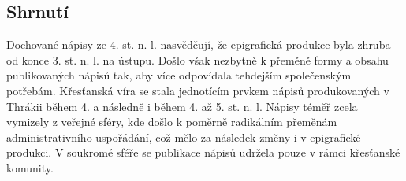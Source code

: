 
\subsection[shrnutí-21]{Shrnutí}

Dochované nápisy ze 4. st. n. l. nasvědčují, že epigrafická produkce byla zhruba od konce 3. st. n. l. na ústupu. Došlo však nezbytně k přeměně formy a obsahu publikovaných nápisů tak, aby více odpovídala tehdejším společenským potřebám. Křesťanská víra se stala jednotícím prvkem nápisů produkovaných v Thrákii během 4. a následně i během 4. až 5. st. n. l. Nápisy téměř zcela vymizely z veřejné sféry, kde došlo k poměrně radikálním přeměnám administrativního uspořádání, což mělo za následek změny i v epigrafické produkci. V soukromé sféře se publikace nápisů udržela pouze v rámci křesťanské komunity.

